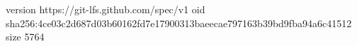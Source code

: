 version https://git-lfs.github.com/spec/v1
oid sha256:4ce03c2d687d03b60162fd7e17900313baeecae797163b39bd9fba94a6c41512
size 5764

